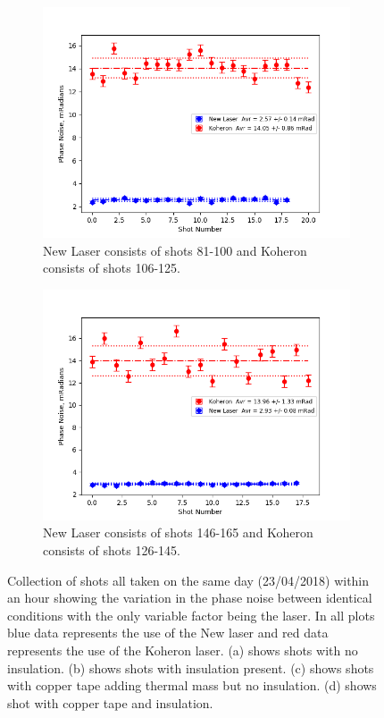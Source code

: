 \documentclass[12pt,a4paper,oneside]{report}
\begin{document}
\begin{figure}[H]
  \begin{subfigure}{.5\textwidth}
    \centering\captionsetup{width=.9\linewidth}
    \includegraphics[width=\textwidth,angle=0]{DImages/Phase_Noise_for_Shots_5and_6.png}
    \caption{New Laser consists of shots 81-100 and Koheron consists of shots 106-125.}
  \end{subfigure}
  \begin{subfigure}{.5\textwidth}
    \centering\captionsetup{width=.9\linewidth}
    \includegraphics[width=\textwidth, angle=0]{DImages/Phase_Noise_for_Shots_7and_8.png}
    \caption{New Laser consists of shots 146-165 and Koheron consists of shots 126-145.}
  \end{subfigure}
\caption{Collection of shots all taken on the same day (23/04/2018) within an hour showing the variation in the phase noise between identical conditions with the only variable factor being the laser. In all plots blue data represents the use of the New laser and red data represents the use of the Koheron laser. (a) shows shots with no insulation. (b) shows shots with insulation present. (c) shows shots with copper tape adding thermal mass but no insulation. (d) shows shot with copper tape and insulation.}
\label{fig:4-phase-noise}
\end{figure}
\end{document}
